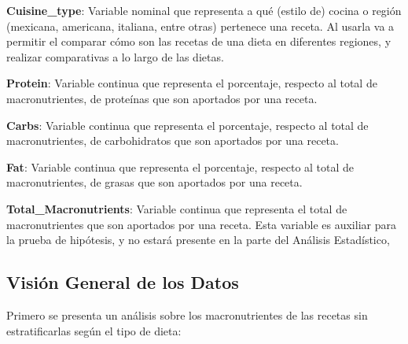 \documentclass[12pt,a4paper]{article}
\begin{document}
{{\begin{itemize}[label=\textbullet]
{                \item \textbf{Cuisine\_type}: Variable nominal que representa a qué (estilo 
                de) cocina o región (mexicana, americana, italiana, entre otras) pertenece una 
                receta. Al usarla va a permitir el comparar cómo son las recetas 
                de una dieta en diferentes regiones, y realizar comparativas a lo 
                largo de las dietas.
                
                \item \textbf{Protein}: Variable continua que representa el 
                porcentaje, respecto al total de macronutrientes, de proteínas que son 
                aportados por una receta.
                \item \textbf{Carbs}: Variable continua que representa el 
                porcentaje, respecto al total de macronutrientes, de carbohidratos que 
                son aportados por una receta.
                
                \item \textbf{Fat}: Variable continua que representa el 
                porcentaje, respecto al total de macronutrientes, de grasas que son 
                aportados por una receta.
                
                \item \textbf{Total\_Macronutrients}: Variable continua que representa 
                el total de macronutrientes que son aportados por una receta. Esta variable 
                es auxiliar para la prueba de hipótesis, y no estará presente en la parte 
                del Análisis Estadístico,    
            }
            \end{itemize}
        }

        \subsection{Visión General de los Datos}
        {
            Primero se presenta un análisis sobre los macronutrientes de 
            las recetas sin estratificarlas según el tipo de dieta:

}}
\end{document}
